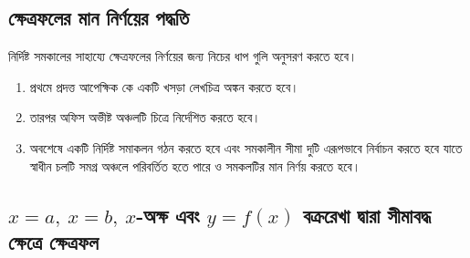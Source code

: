 \subsection{ ক্ষেত্রফলের মান নির্ণয়ের পদ্ধতি }


 নির্দিষ্ট সমকালের সাহায্যে ক্ষেত্রফলের নির্ণয়ের জন্য নিচের ধাপ গুলি অনুসরণ করতে হবে। 

\begin{enumerate}
    \item প্রথমে প্রদত্ত আপেক্ষিক কে একটি খসড়া লেখচিত্র অঙ্কন করতে হবে।
    \item তারপর অফিস অভীষ্ট অঞ্চলটি চিত্রে নির্দেশিত করতে হবে।
    \item অবশেষে একটি নির্দিষ্ট সমাকলন গঠন করতে হবে এবং সমকালীন সীমা দুটি এরূপভাবে নির্বাচন করতে হবে যাতে স্বাধীন চলটি সমগ্র অঞ্চলে পরিবর্তিত হতে পারে ও সমকলটির মান নির্ণয় করতে হবে।

\end{enumerate}



\subsection{ $x = a,\: x = b,\: x$-অক্ষ এবং $y = f(x)$ বক্ররেখা দ্বারা সীমাবদ্ধ ক্ষেত্রে ক্ষেত্রফল}

